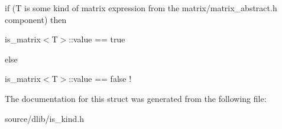 \begin{DoxyItemize}
\item if (T is some kind of matrix expression from the matrix/matrix\_\-abstract.h component) then
\begin{DoxyItemize}
\item is\_\-matrix$<$T$>$::value == true
\end{DoxyItemize}
\item else
\begin{DoxyItemize}
\item is\_\-matrix$<$T$>$::value == false ! 
\end{DoxyItemize}
\end{DoxyItemize}

The documentation for this struct was generated from the following file:\begin{DoxyCompactItemize}
\item 
source/dlib/is\_\-kind.h\end{DoxyCompactItemize}
